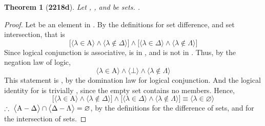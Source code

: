\documentclass[preview]{standalone}
\newtheorem*{theorem*}{Theorem}
\begin{document}
\begin{theorem*}[\textbf{2218d}] \color{black}
    Let , \bm{$\Lambda$}, and \bm{$\Delta$} be sets. 
    .
\end{theorem*}
\begin{proof} \color{black}
    Let \bm{$\lambda$} be an element in 
    .
    By the definitions for set difference, and set intersection, that is
    \begin{equation*}
        \bigg[
            \Big \langle \lambda \in \mathrm{A} \Big \rangle
                \land
            \Big \langle \lambda \notin \Delta \Big \rangle
        \bigg]
            \land
        \bigg[
            \Big \langle \lambda \in \Delta \Big \rangle
                \land
            \Big \langle \lambda \notin \Lambda \Big \rangle
        \bigg]
    \end{equation*}
    Since logical conjunction is associative, 
    \bm{$\lambda$} is in \bm{$\Delta$},
    and \bm{$\lambda$} is not in \bm{$\Delta$}. 
    Thus, by the negation law of logic,
    \begin{equation*}
        \Big \langle \lambda \in \mathrm{A} \Big \rangle
            \land
        \Big \langle \bot \Big \rangle
            \land
        \Big \langle \lambda \notin \Lambda \Big \rangle
    \end{equation*}
    This statement is \bm{$\bot$}, 
    by the domination law for logical conjunction. 
    And the logical identity for \bm{$\lambda \in \varnothing$} is trivially \bm{$\bot$},
    since the empty set contains no members. 
    Hence,
    \begin{equation*}
        \bigg[
            \Big \langle \lambda \in \mathrm{A} \Big \rangle
                \land
            \Big \langle \lambda \notin \Delta \Big \rangle
        \bigg]
            \land
        \bigg[
            \Big \langle \lambda \in \Delta \Big \rangle
                \land
            \Big \langle \lambda \notin \Lambda \Big \rangle
        \bigg]
            \equiv
        \Big \langle \lambda \in \varnothing \Big \rangle
    \end{equation*}
    $\therefore \text{\space} \relax{
    \big \langle \mathrm{A} - \Delta \big \rangle
        \cap 
    \big \langle \Delta - \Lambda \big \rangle
        = 
    \varnothing
    }$,
    by the definitions for the difference of sets, 
    and for the intersection of sets.
\color{lightgray} \end{proof}
\end{document}
